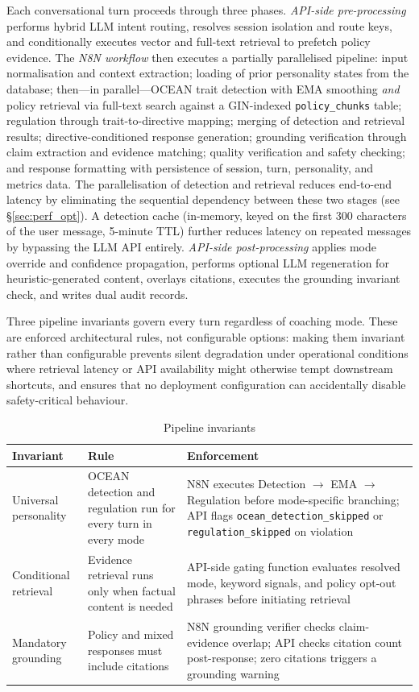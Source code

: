 \documentclass[10pt,a4paper]{report}
\begin{document}
Each conversational turn proceeds through three phases. \emph{API-side pre-processing} performs hybrid LLM intent routing, resolves session isolation and route keys, and conditionally executes vector and full-text retrieval to prefetch policy evidence. The \emph{N8N workflow} then executes a partially parallelised pipeline: input normalisation and context extraction; loading of prior personality states from the database; then---in parallel---OCEAN trait detection with EMA smoothing \emph{and} policy retrieval via full-text search against a GIN-indexed \texttt{policy\_chunks} table; regulation through trait-to-directive mapping; merging of detection and retrieval results; directive-conditioned response generation; grounding verification through claim extraction and evidence matching; quality verification and safety checking; and response formatting with persistence of session, turn, personality, and metrics data. The parallelisation of detection and retrieval reduces end-to-end latency by eliminating the sequential dependency between these two stages (see \S\ref{sec:perf_opt}). A detection cache (in-memory, keyed on the first 300 characters of the user message, 5-minute TTL) further reduces latency on repeated messages by bypassing the LLM API entirely. \emph{API-side post-processing} applies mode override and confidence propagation, performs optional LLM regeneration for heuristic-generated content, overlays citations, executes the grounding invariant check, and writes dual audit records.

Three pipeline invariants govern every turn regardless of coaching mode. These are enforced architectural rules, not configurable options: making them invariant rather than configurable prevents silent degradation under operational conditions where retrieval latency or API availability might otherwise tempt downstream shortcuts, and ensures that no deployment configuration can accidentally disable safety-critical behaviour.

\begin{table}[H]
\centering\small
\caption{Pipeline invariants}
\begin{tabularx}{\textwidth}{@{}lXX@{}}
\toprule
Invariant & Rule & Enforcement \\
\midrule
Universal personality & OCEAN detection and regulation run for every turn in every mode & N8N executes Detection $\rightarrow$ EMA $\rightarrow$ Regulation before mode-specific branching; API flags \texttt{ocean\_detection\_skipped} or \texttt{regulation\_skipped} on violation \\
Conditional retrieval & Evidence retrieval runs only when factual content is needed & API-side gating function evaluates resolved mode, keyword signals, and policy opt-out phrases before initiating retrieval \\
Mandatory grounding & Policy and mixed responses must include citations & N8N grounding verifier checks claim-evidence overlap; API checks citation count post-response; zero citations triggers a grounding warning \\
\bottomrule
\end{tabularx}
\end{table}
\end{document}
